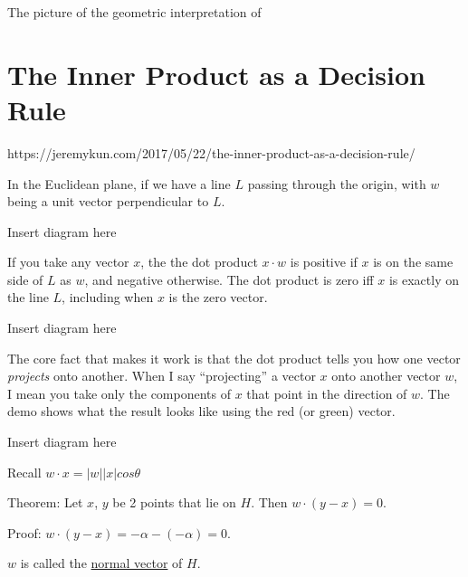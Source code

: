 \documentclass{report}
\begin{document}
The picture of the geometric interpretation of 









\section{The Inner Product as a Decision Rule}

https://jeremykun.com/2017/05/22/the-inner-product-as-a-decision-rule/\newline

In the Euclidean plane, if we have a line $L$ passing through the origin, with $w$ being a unit vector perpendicular to $L$.\newline\newline

Insert diagram here\newline\newline

If you take any vector $x$, the the dot product $x \cdot w$ is positive if $x$ is on the same side of $L$ as $w$, and negative otherwise. The dot product is zero iff $x$ is exactly on the line $L$, including when $x$ is the zero vector.\newline\newline

Insert diagram here\newline\newline

The core fact that makes it work is that the dot product tells you how one vector \textit{projects} onto another. When I say “projecting” a vector $x$ onto another vector $w$, I mean you take only the components of $x$ that point in the direction of $w$. The demo shows what the result looks like using the red (or green) vector.\newline\newline

Insert diagram here\newline\newline

Recall $w \cdot x = |w||x|cos \theta $ 


Theorem: Let $x$, $y$ be 2 points that lie on $H$. Then $w \cdot (y-x) = 0$.

Proof: $w \cdot (y-x) = -\alpha - (- \alpha) = 0$.

$w$ is called the \underline{normal vector} of $H$.
\end{document}
